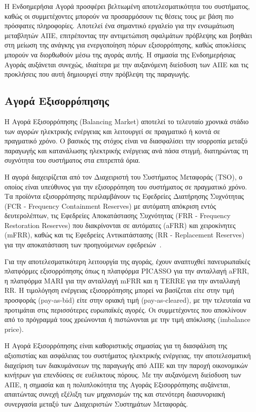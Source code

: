 Η Ενδοημερήσια Αγορά προσφέρει βελτιωμένη αποτελεσματικότητα του συστήματος, καθώς οι συμμετέχοντες μπορούν να προσαρμόσουν τις θέσεις τους με βάση πιο πρόσφατες πληροφορίες. Αποτελεί ένα σημαντικό εργαλείο για την ενσωμάτωση μεταβλητών ΑΠΕ, επιτρέποντας την αντιμετώπιση σφαλμάτων πρόβλεψης και βοηθάει στη μείωση της ανάγκης για ενεργοποίηση πόρων εξισορρόπησης, καθώς αποκλίσεις μπορούν να διορθωθούν μέσω της αγοράς αυτής. Η σημασία της Ενδοημερήσιας Αγοράς αυξάνεται συνεχώς, ιδιαίτερα με την αυξανόμενη διείσδυση των ΑΠΕ και τις προκλήσεις που αυτή δημιουργεί στην πρόβλεψη της παραγωγής.

\subsection{Αγορά Εξισορρόπησης}
\label{subsec:balancing-market}

Η Αγορά Εξισορρόπησης (Balancing Market) αποτελεί το τελευταίο χρονικά στάδιο των αγορών ηλεκτρικής ενέργειας και λειτουργεί σε πραγματικό ή κοντά σε πραγματικό χρόνο. Ο βασικός της στόχος είναι να διασφαλίσει την ισορροπία μεταξύ παραγωγής και κατανάλωσης ηλεκτρικής ενέργειας ανά πάσα στιγμή, διατηρώντας τη συχνότητα του συστήματος στα επιτρεπτά όρια.

Η αγορά διαχειρίζεται από τον Διαχειριστή του Συστήματος Μεταφοράς (TSO), ο οποίος είναι υπεύθυνος για την εξισορρόπηση του συστήματος σε πραγματικό χρόνο. Τα προϊόντα εξισορρόπησης περιλαμβάνουν τις Εφεδρείες Διατήρησης Συχνότητας (FCR - Frequency Containment Reserves) με αυτόματη απόκριση εντός δευτερολέπτων, τις Εφεδρείες Αποκατάστασης Συχνότητας (FRR - Frequency Restoration Reserves) που διακρίνονται σε αυτόματες (aFRR) και χειροκίνητες (mFRR), καθώς και τις Εφεδρείες Αντικατάστασης (RR - Replacement Reserves) για την αποκατάσταση των προηγούμενων εφεδρειών~\cite{entsoe-balancing}.

Για την αποτελεσματικότερη λειτουργία της αγοράς, έχουν αναπτυχθεί πανευρωπαϊκές πλατφόρμες εξισορρόπησης όπως η πλατφόρμα PICASSO για την ανταλλαγή aFRR, η πλατφόρμα MARI για την ανταλλαγή mFRR και η TERRE για την ανταλλαγή RR. Η τιμολόγηση ενέργειας εξισορρόπησης μπορεί να βασίζεται είτε στην τιμή προσφοράς (pay-as-bid) είτε στην οριακή τιμή (pay-as-cleared), με την τελευταία να προτιμάται στις περισσότερες ευρωπαϊκές αγορές. Οι συμμετέχοντες που αποκλίνουν από το πρόγραμμά τους χρεώνονται ή πιστώνονται με την τιμή απόκλισης (imbalance price).

Η Αγορά Εξισορρόπησης είναι καθοριστικής σημασίας για τη διασφάλιση της αξιοπιστίας και ασφάλειας του συστήματος ηλεκτρικής ενέργειας, την αποτελεσματική διαχείριση των διακυμάνσεων της παραγωγής από ΑΠΕ και την παροχή οικονομικών κινήτρων για επενδύσεις σε ευέλικτους πόρους. Με την αυξανόμενη διείσδυση των ΑΠΕ, η σημασία και η πολυπλοκότητα της Αγοράς Εξισορρόπησης αυξάνεται, απαιτώντας συνεχή εξέλιξη των μηχανισμών της και στενότερη διασυνοριακή συνεργασία μεταξύ των Διαχειριστών Συστημάτων Μεταφοράς.


